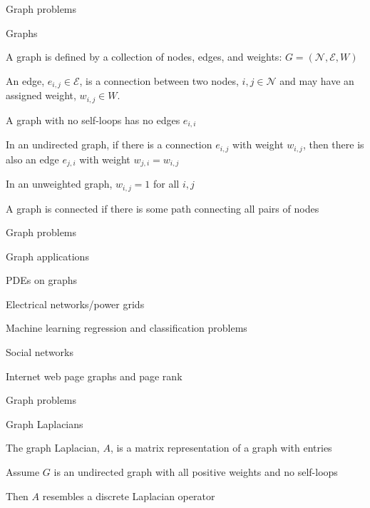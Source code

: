 \documentclass[18pt,xcolor=table]{beamer}
\begin{document}
\begin{frame}{Graph problems}
\begin{block}{Graphs}
\bit
\item A graph is defined by a collection of nodes, edges, and weights: $G = (\mathcal{N},\mathcal{E},W)$
\item An edge, $e_{i,j}\in\mathcal{E}$, is a connection between two nodes, $i,j\in\mathcal{N}$ and may have an assigned weight, $w_{i,j}\in W$.
\item A graph with no self-loops has no edges $e_{i,i}$
\item In an undirected graph, if there is a connection $e_{i,j}$ with weight $w_{i,j}$, then there is also an edge $e_{j,i}$ with weight $w_{j,i} = w_{i,j}$
\item In an unweighted graph, $w_{i,j} = 1$ for all $i,j$
\item A graph is connected if there is some path connecting all pairs of nodes
\eit
\end{block}
\end{frame}

\begin{frame}{Graph problems}
\begin{block}{Graph applications}
\bit
\item PDEs on graphs
\item Electrical networks/power grids
\item Machine learning regression and classification problems
\item Social networks
\item Internet web page graphs and page rank
\eit
\end{block}
\end{frame}

\begin{frame}{Graph problems}
\begin{block}{Graph Laplacians}
\bit
\item The graph Laplacian, $A$, is a matrix representation of a graph with entries
\item Assume $G$ is an undirected graph with all positive weights and no self-loops
\item Then $A$ resembles a discrete Laplacian operator 
\eit
\end{block}
\end{frame}
\end{document}
